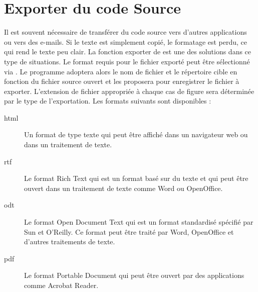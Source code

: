 \section{Exporter du code Source}\label{sec:src_exporter}

Il est souvent nécessaire de transférer du code source vers d'autres applications ou vers des e-mails. Si le texte est simplement copié, le formatage est perdu, ce qui rend le texte peu clair.
La fonction exporter de \codeblocks est une des solutions dans ce type de situations. Le format requis pour le fichier exporté peut être sélectionné via . Le programme adoptera alors le nom de fichier et le répertoire cible en fonction du fichier source ouvert et les proposera pour enregistrer le fichier à exporter. L'extension de fichier appropriée à chaque cas de figure sera déterminée par le type de l'exportation. Les formats suivants sont disponibles :

\begin{description}
\item[html] Un format de type texte qui peut être affiché dans un navigateur web ou dans un traitement de texte.
\item[rtf] Le format Rich Text qui est un format basé sur du texte et qui peut être ouvert dans un traitement de texte comme Word ou OpenOffice.
\item[odt] Le format Open Document Text qui est un format standardisé spécifié par Sun et O'Reilly. Ce format peut être traité par Word, OpenOffice et d'autres traitements de texte.
\item[pdf] Le format Portable Document qui peut être ouvert par des applications comme Acrobat Reader.
\end{description}


